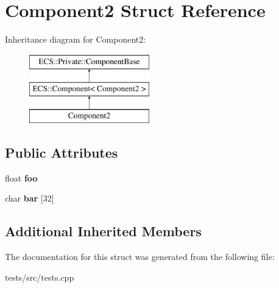 \hypertarget{struct_component2}{\section{Component2 Struct Reference}
\label{struct_component2}
}
Inheritance diagram for Component2\-:\begin{figure}[H]
\begin{center}
\leavevmode
\includegraphics[height=3.000000cm]{struct_component2}
\end{center}
\end{figure}
\subsection*{Public Attributes}
\begin{DoxyCompactItemize}
\item 
\hypertarget{struct_component2_ababce67a405d155343e9f02facb764c0}{float {\bfseries foo}}\label{struct_component2_ababce67a405d155343e9f02facb764c0}

\item 
\hypertarget{struct_component2_a3f1e0b27014b818e02009076574b38bc}{char {\bfseries bar} \mbox{[}32\mbox{]}}\label{struct_component2_a3f1e0b27014b818e02009076574b38bc}

\end{DoxyCompactItemize}
\subsection*{Additional Inherited Members}


The documentation for this struct was generated from the following file\-:\begin{DoxyCompactItemize}
\item 
tests/src/tests.\-cpp\end{DoxyCompactItemize}
